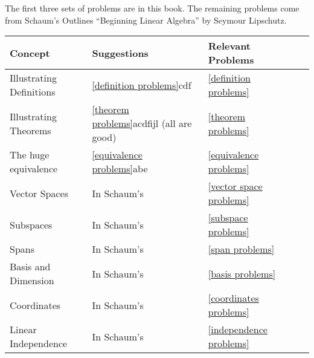 The first three sets of problems are in this book.  The remaining problems come from Schaum's Outlines ``Beginning Linear Algebra'' by Seymour Lipschutz.  
\begin{center}
\begin{tabular}{|l|l|l|l|l|}
\hline
Concept&Suggestions&Relevant Problems\\ \hline
Illustrating Definitions
	&\ref{definition problems}cdf
  &\ref{definition problems}
  \\ \hline
Illustrating Theorems
	& \ref{theorem problems}acdfijl (all are good)  
	&\ref{theorem problems}
	\\ \hline
The huge equivalence
	&\ref{equivalence problems}abe 
	&\ref{equivalence problems}
	\\ \hline
Vector Spaces
	& In Schaum's
	&\ref{vector space problems}
	\\ \hline
Subspaces
	& In Schaum's
	&\ref{subspace problems}
	\\ \hline
Spans
	&In Schaum's
	&\ref{span problems}
	\\ \hline
Basis and Dimension
	&In Schaum's
	&\ref{basis problems}
	\\ \hline
Coordinates
	&In Schaum's
	&\ref{coordinates problems}
	\\ \hline
Linear Independence
	&In Schaum's
	&\ref{independence problems}
	\\ \hline
\end{tabular}
\end{center}

